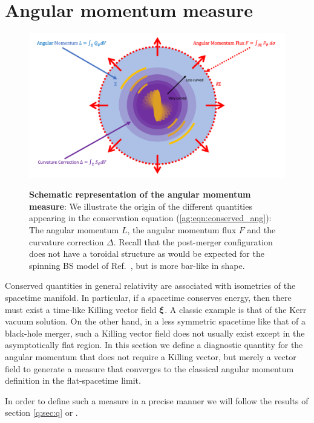 \section{Angular momentum measure}\label{ag:sec:methods}

\begin{figure}[h!]
\begin{center}
    {\includegraphics[width=0.75\columnwidth]{ag_fig/FigureRobinPaper.png}}
\caption{{\bf Schematic representation of the angular momentum measure}: We illustrate the origin of the different quantities 
appearing in the conservation equation
(\ref{ag:eqn:conserved_ang}): The angular momentum
    ${L}$, the {angular momentum flux} $F$ and the
    curvature correction ${\Delta}$. Recall that the post-merger
    configuration does not have a toroidal structure
    as would be expected for the spinning BS model of
    Ref.~\cite{PhysRevD.90.024068,Yoshida:1997qf}, but is more bar-like in shape.
    }
\label{ag:fig:AngMomTrick}
\end{center}
\end{figure}

Conserved quantities in general relativity are associated with isometries of the spacetime manifold. In particular, if a spacetime conserves energy, then there must exist a time-like Killing vector field $\boldsymbol{\xi}$. A classic example is that of the Kerr vacuum solution. On the other hand, in a less symmetric spacetime like that of a black-hole merger, such a Killing vector field does not usually exist except in the asymptotically flat region. In this section we define a diagnostic quantity for the angular momentum that does not require a Killing vector, but merely a vector field to generate a measure that
converges to the classical angular momentum definition
in the flat-spacetime limit.

In order to define such a measure in a
precise manner we will follow the results of section \ref{q:sec:q} or \cite{Croft:2022gks,Clough:2021qlv}.



